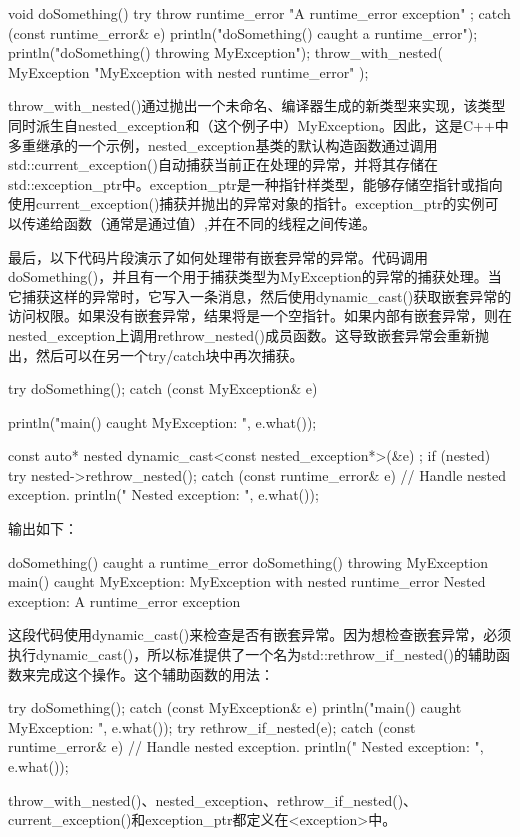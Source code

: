 \begin{cpp}
void doSomething()
{
    try {
        throw runtime_error { "A runtime_error exception" };
    } catch (const runtime_error& e) {
        println("doSomething() caught a runtime_error");
        println("doSomething() throwing MyException");
        throw_with_nested(
            MyException { "MyException with nested runtime_error" });
    }
}
\end{cpp}

throw\_with\_nested()通过抛出一个未命名、编译器生成的新类型来实现，该类型同时派生自nested\_exception和（这个例子中）MyException。因此，这是C++中多重继承的一个示例，nested\_exception基类的默认构造函数通过调用std::current\_exception()自动捕获当前正在处理的异常，并将其存储在std::exception\_ptr中。exception\_ptr是一种指针样类型，能够存储空指针或指向使用current\_exception()捕获并抛出的异常对象的指针。exception\_ptr的实例可以传递给函数（通常是通过值）,并在不同的线程之间传递。

最后，以下代码片段演示了如何处理带有嵌套异常的异常。代码调用doSomething()，并且有一个用于捕获类型为MyException的异常的捕获处理。当它捕获这样的异常时，它写入一条消息，然后使用dynamic\_cast()获取嵌套异常的访问权限。如果没有嵌套异常，结果将是一个空指针。如果内部有嵌套异常，则在nested\_exception上调用rethrow\_nested()成员函数。这导致嵌套异常会重新抛出，然后可以在另一个try/catch块中再次捕获。

\begin{cpp}
try {
    doSomething();
} catch (const MyException& e) {
    println("main() caught MyException: {}", e.what());

    const auto* nested { dynamic_cast<const nested_exception*>(&e) };
    if (nested) {
        try {
            nested->rethrow_nested();
        } catch (const runtime_error& e) {
            // Handle nested exception.
            println(" Nested exception: {}", e.what());
        }
    }
}
\end{cpp}

输出如下：

\begin{shell}
doSomething() caught a runtime_error
doSomething() throwing MyException
main() caught MyException: MyException with nested runtime_error
  Nested exception: A runtime_error exception
\end{shell}


这段代码使用dynamic\_cast()来检查是否有嵌套异常。因为想检查嵌套异常，必须执行dynamic\_cast()，所以标准提供了一个名为std::rethrow\_if\_nested()的辅助函数来完成这个操作。这个辅助函数的用法：

\begin{cpp}
try {
    doSomething();
} catch (const MyException& e) {
    println("main() caught MyException: {}", e.what());
    try {
        rethrow_if_nested(e);
    } catch (const runtime_error& e) {
        // Handle nested exception.
        println(" Nested exception: {}", e.what());
    }
}
\end{cpp}

throw\_with\_nested()、nested\_exception、rethrow\_if\_nested()、current\_exception()和exception\_ptr都定义在<exception>中。







